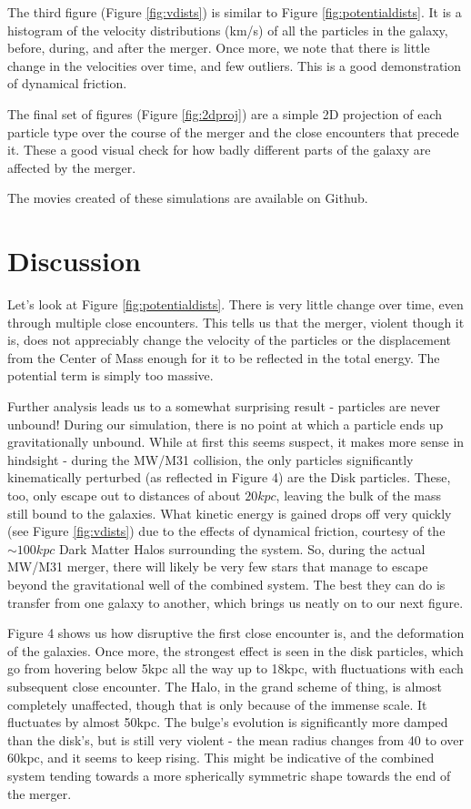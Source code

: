 \documentclass[linenumbers, ]{aastex631}
\begin{document}
The third figure (Figure \ref{fig:vdists}) is similar to Figure \ref{fig:potentialdists}. It is a histogram of the velocity distributions (km/s) of all the particles in the galaxy, before, during, and after the merger. Once more, we note that there is little change in the velocities over time, and few outliers. This is a good demonstration of dynamical friction.

The final set of figures (Figure \ref{fig:2dproj}) are a simple 2D projection of each particle type over the course of the merger and the close encounters that precede it. These a good visual check for how badly different parts of the galaxy are affected by the merger.

The movies created of these simulations are available on Github.

\section{Discussion}
Let's look at Figure \ref{fig:potentialdists}. There is very little change over time, even through multiple close encounters. This tells us that the merger, violent though it is, does not appreciably change the velocity of the particles or the displacement from the Center of Mass enough for it to be reflected in the total energy. The potential term is simply too massive.

Further analysis leads us to a somewhat surprising result - particles are never unbound! During our simulation, there is no point at which a particle ends up gravitationally unbound. While at first this seems suspect, it makes more sense in hindsight - during the MW/M31 collision, the only particles significantly kinematically perturbed (as reflected in Figure 4) are the Disk particles. These, too, only escape out to distances of about $20kpc$, leaving the bulk of the mass still bound to the galaxies. What kinetic energy is gained drops off very quickly (see Figure \ref{fig:vdists}) due to the effects of dynamical friction, courtesy of the $\sim 100kpc$ Dark Matter Halos surrounding the system. So, during the actual MW/M31 merger, there will likely be very few stars that manage to escape beyond the gravitational well of the combined system. The best they can do is transfer from one galaxy to another, which brings us neatly on to our next figure.

Figure 4 shows us how disruptive the first close encounter is, and the deformation of the galaxies. Once more, the strongest effect is seen in the disk particles, which go from hovering below 5kpc all the way up to 18kpc, with fluctuations with each subsequent close encounter. The Halo, in the grand scheme of thing, is almost completely unaffected, though that is only because of the immense scale. It fluctuates by almost 50kpc. The bulge's evolution is significantly more damped than the disk's, but is still very violent - the mean radius changes from 40 to over 60kpc, and it seems to keep rising. This might be indicative of the combined system tending towards a more spherically symmetric shape towards the end of the merger.
\end{document}
